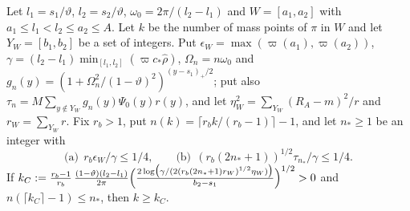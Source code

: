 \begin{lemma}\label{lem:C-count}
Let $l_1=s_1/\vartheta$, $l_2=s_2/\vartheta$, $\omega_0=2\pi/(l_2-l_1)$ and $W=[a_1,a_2]$ with $a_1\le l_1<l_2\le a_2\le A$. Let $k$ be the number of mass points of $\pi$ in $W$ and let $Y_W=[b_1,b_2]$ be a set of integers. Put $\epsilon_W=\max(\varpi(a_1),\varpi(a_2))$,
$\gamma=(l_2-l_1)\min_{[l_1,l_2]}(\varpi c_*\hat\rho)$, $\Omega_n=n\omega_0$ and $g_n(y)=(1+\Omega_n^2/(1-\vartheta)^2)^{(y-s_1)_+/2}$; put also $\tau_n=M\sum_{y\notin Y_W}g_n(y)\Psi_0(y)r(y)$, and let $\eta_W^2=\sum_{Y_W}(R_A-m)^2/r$ and $r_W=\sum_{Y_W}r$. Fix $r_b>1$, put
$n(k)=\lceil r_bk/(r_b-1)\rceil-1$, and let $n_*\ge1$ be an integer with
\[
\text{(a)}\ \ r_b\epsilon_W/\gamma\le1/4,\qquad\text{(b)}\ \ (r_b(2n_*+1))^{1/2}\tau_{n_*}/\gamma\le1/4 .
\]
If
$k_C:=\frac{r_b-1}{r_b}\,\frac{(1-\vartheta)(l_2-l_1)}{2\pi}\Bigl(\frac{2\log\bigl(\gamma/(2(r_b(2n_*+1)r_W)^{1/2}\eta_W)\bigr)}{b_2-s_1}\Bigr)^{1/2}>0$
and $n(\lceil k_C\rceil-1)\le n_*$, then $k\ge k_C$.
\end{lemma}
